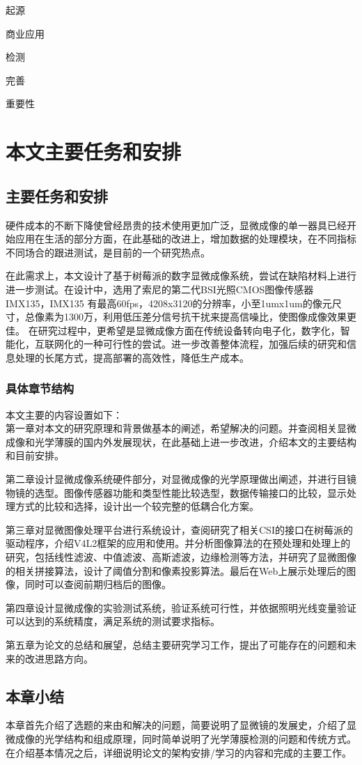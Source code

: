 起源

商业应用

检测

完善

重要性

\section{本文主要任务和安排}
\subsection{主要任务和安排}
硬件成本的不断下降使曾经昂贵的技术使用更加广泛，显微成像的单一器具已经开始应用在生活的部分方面，在此基础的改进上，增加数据的处理模块，在不同指标不同场合的跟进测试，是目前的一个研究热点。

在此需求上，本文设计了基于树莓派的数字显微成像系统，尝试在缺陷材料上进行进一步测试。在设计中，选用了索尼的第二代BSI光照CMOS图像传感器IMX135，IMX135 有最高60fps，4208x3120的分辨率，小至1umx1um的像元尺寸，总像素为1300万，利用低压差分信号抗干扰来提高信噪比，使图像成像效果更佳。
在研究过程中，更希望是显微成像方面在传统设备转向电子化，数字化，智能化，互联网化的一种可行性的尝试。进一步改善整体流程，加强后续的研究和信息处理的长尾方式，提高部署的高效性，降低生产成本。

	
\subsubsection{具体章节结构}
本文主要的内容设置如下：\\
第一章对本文的研究原理和背景做基本的阐述，希望解决的问题。并查阅相关显微成像和光学薄膜的国内外发展现状，在此基础上进一步改进，介绍本文的主要结构和目前安排。

第二章设计显微成像系统硬件部分，对显微成像的光学原理做出阐述，并进行目镜物镜的选型。图像传感器功能和类型性能比较选型，数据传输接口的比较，显示处理方式的比较和选择，设计出一个较完整的低耦合化方案。

第三章对显微图像处理平台进行系统设计，查阅研究了相关CSI的接口在树莓派的驱动程序，介绍V4L2框架的应用和使用。并分析图像算法的在预处理和处理上的研究，包括线性滤波、中值滤波、高斯滤波，边缘检测等方法，并研究了显微图像的相关拼接算法，设计了阈值分割和像素投影算法。最后在Web上展示处理后的图像，同时可以查阅前期归档后的图像。

第四章设计显微成像的实验测试系统，验证系统可行性，并依据照明光线变量验证可以达到的系统精度，满足系统的测试要求指标。

第五章为论文的总结和展望，总结主要研究学习工作，提出了可能存在的问题和未来的改进思路方向。


\subsection{本章小结}
本章首先介绍了选题的来由和解决的问题，简要说明了显微镜的发展史，介绍了显微成像的光学结构和组成原理，同时简单说明了光学薄膜检测的问题和传统方式。在介绍基本情况之后，详细说明论文的架构安排/学习的内容和完成的主要工作。
